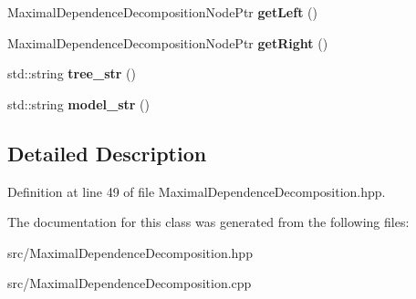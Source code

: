 \begin{DoxyCompactItemize}
Maximal\+Dependence\+Decomposition\+Node\+Ptr {\bfseries get\+Left} ()
\item 
\mbox{\label{classtops_1_1MaximalDependenceDecompositionNode_a2f903d1ad7d4a1cefde29364e9d04a66}} 
Maximal\+Dependence\+Decomposition\+Node\+Ptr {\bfseries get\+Right} ()
\item 
\mbox{\label{classtops_1_1MaximalDependenceDecompositionNode_a52567073103536d3dd29b59475ef7b3d}} 
std\+::string {\bfseries tree\+\_\+str} ()
\item 
\mbox{\label{classtops_1_1MaximalDependenceDecompositionNode_ab73eb8833266774203a802cab218286e}} 
std\+::string {\bfseries model\+\_\+str} ()
\end{DoxyCompactItemize}


\subsection{Detailed Description}


Definition at line 49 of file Maximal\+Dependence\+Decomposition.\+hpp.



The documentation for this class was generated from the following files\+:\begin{DoxyCompactItemize}
\item 
src/Maximal\+Dependence\+Decomposition.\+hpp\item 
src/Maximal\+Dependence\+Decomposition.\+cpp\end{DoxyCompactItemize}
